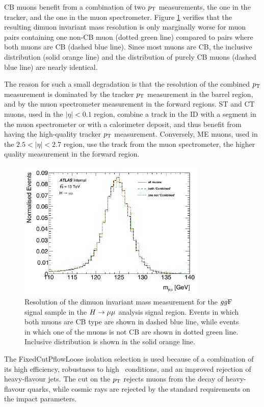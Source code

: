 CB muons benefit from a combination of two $p_{\text{T}}$ measurements,
the one in the tracker, and the one in the muon spectrometer.
Figure \ref{fig:hmumu:reso} verifies that the resulting dimuon
invariant mass resolution is only marginally worse for muon
pairs containing one non-CB muon (dotted green line) compared
to pairs where both muons are CB (dashed blue line). Since
most muons are CB, the inclusive distribution (solid orange
line) and the distribution of purely CB muons (dashed blue line)
are nearly identical.

The reason for such a small degradation is that the resolution of the combined
$p_{\text{T}}$ measurement is dominated by the tracker $p_{\text{T}}$ measurement
in the barrel region, and by the muon spectrometer measurement
in the forward regions. ST and CT muons, used in the $|\eta| <
0.1$ region, combine a track in the ID with a segment in the
muon spectrometer or with a calorimeter deposit, and thus 
benefit from having the high-quality tracker $p_{\text{T}}$ measurement.
Conversely, ME muons, used in the $2.5 < |\eta| < 2.7$ region,
use the track from the muon spectrometer, the higher quality
measurement in the forward region.
\begin{figure}[h!]
  \centering
  \includegraphics[width=0.8\textwidth]{figures/hmumu/resolution}
  \caption[Muon resolution for different muon types]{Resolution
  of the dimuon invariant mass measurement for the $gg\text{F}$ signal
  sample in the $H \rightarrow \mu\mu$ analysis signal region. Events in which
  both muons are CB type are shown in dashed blue line, while
  events in which one of the muons is not CB are shown in dotted
  green line. Inclusive distribution is shown in the solid orange
  line.}
  \label{fig:hmumu:reso}
\end{figure}
The FixedCutPflowLoose isolation selection is used because
of a combination of its high efficiency, robustness to high
\pileup~conditions, and an improved rejection of heavy-flavour
jets. The cut on the $p_{\text{T}}$ rejects muons from the decay of
heavy-flavour quarks, while cosmic rays are rejected by the
standard requirements on the impact parameters.

